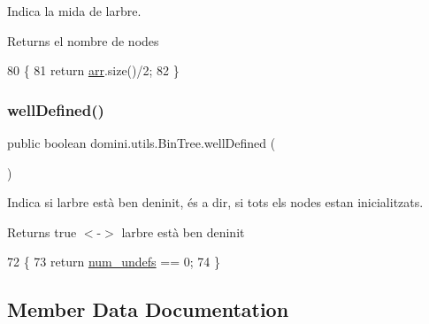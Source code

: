 Indica la mida de l\textquotesingle{}arbre. 

\begin{DoxyReturn}{Returns}
el nombre de nodes 
\end{DoxyReturn}

\begin{DoxyCode}
80                       \{
81         \textcolor{keywordflow}{return} \hyperlink{classdomini_1_1utils_1_1BinTree_a357bcbcf07ba7fcb99d11b237d189e65}{arr}.size()/2;
82     \}
\end{DoxyCode}
\mbox{\label{classdomini_1_1utils_1_1BinTree_a30f097b37ebea20379d9c2930e8fa27f}} 
\subsubsection{\texorpdfstring{well\+Defined()}{wellDefined()}}
{\footnotesize\ttfamily public boolean domini.\+utils.\+Bin\+Tree.\+well\+Defined (\begin{DoxyParamCaption}{ }\end{DoxyParamCaption})\hspace{0.3cm}{\ttfamily [inline]}}



Indica si l\textquotesingle{}arbre està ben deninit, és a dir, si tots els nodes estan inicialitzats. 

\begin{DoxyReturn}{Returns}
true $<$-\/$>$ l\textquotesingle{}arbre està ben deninit 
\end{DoxyReturn}

\begin{DoxyCode}
72                                  \{
73         \textcolor{keywordflow}{return} \hyperlink{classdomini_1_1utils_1_1BinTree_a36f1212262c353accbc0a0385fa45a8d}{num\_undefs} == 0;
74     \}
\end{DoxyCode}


\subsection{Member Data Documentation}
\mbox{\label{classdomini_1_1utils_1_1BinTree_a357bcbcf07ba7fcb99d11b237d189e65}} 
